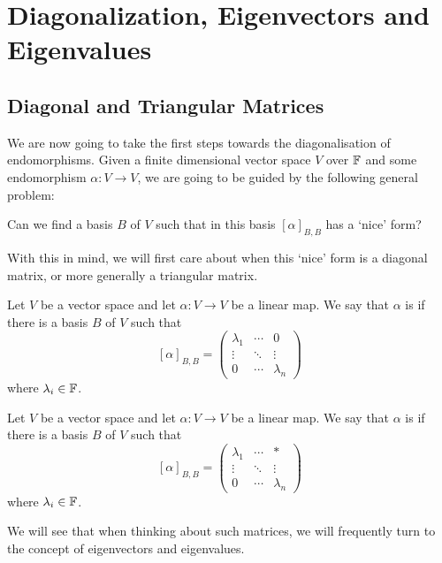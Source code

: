 \documentclass[a4paper]{scrartcl}
\begin{document}
\section{Diagonalization, Eigenvectors and Eigenvalues}


\subsection{Diagonal and Triangular Matrices}

We are now going to take the first steps towards the diagonalisation of endomorphisms. 
Given a finite dimensional vector space $V$ over $\mathbb{F}$ and some endomorphism $\alpha: V \rightarrow V$, we are going to be guided by the following general problem:
\begin{center}\color{blue}
    Can we find a basis $B$ of $V$ such that in this basis $[\alpha]_{B, B}$ has a `nice' form?
\end{center}
With this in mind, we will first care about when this `nice' form is a diagonal matrix, or more generally a triangular matrix.


\begin{definition}[Diagonalizable]
    Let $V$ be a vector space and let $\alpha: V \rightarrow V$ be a linear map. We say that $\alpha$ is  if there is a basis $B$ of $V$ such that
    $$
    [\alpha]_{B, B} = \begin{pmatrix}
        \lambda_1 & \cdots & 0 \\
        \vdots & \ddots & \vdots \\
        0 & \cdots & \lambda_n
    \end{pmatrix}
    $$
    where $\lambda_i \in \mathbb{F}$.
\end{definition}

\begin{definition}[Triangulable]    
    Let $V$ be a vector space and let $\alpha: V \rightarrow V$ be a linear map. We say that $\alpha$ is  if there is a basis $B$ of $V$ such that
    $$
    [\alpha]_{B, B} = \begin{pmatrix}
        \lambda_1 & \cdots & * \\
        \vdots & \ddots & \vdots \\
        0 & \cdots & \lambda_n
    \end{pmatrix}
    $$
    where $\lambda_i \in \mathbb{F}$. 
\end{definition}


We will see that when thinking about such matrices, we will frequently turn to the concept of eigenvectors and eigenvalues.
\end{document}

